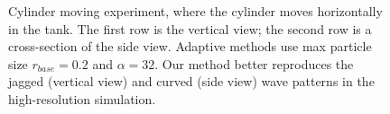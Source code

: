 \documentclass[VANCOUVER,STIX1COL]{WileyNJD-v2}
\begin{document}
\begin{figure}[t]
\setcounter{subfigure}{0}
\vspace{-0.7\baselineskip}
\caption{
Cylinder moving experiment, where the cylinder moves horizontally in the tank. The first row is the vertical view; the second row is a cross-section of the side view. Adaptive methods use max particle size $r_{base} = 0.2$ and $\alpha = 32$. Our method better reproduces the jagged (vertical view) and curved (side view) wave patterns in the high-resolution simulation.
}
\label{fig:rod}

\end{figure}
\end{document}
